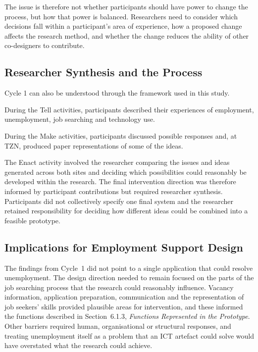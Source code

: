 The issue is therefore not whether participants should have power to change the process, but how that power is balanced. Researchers need to consider which decisions fall within a participant's area of experience, how a proposed change affects the research method, and whether the change reduces the ability of other co-designers to contribute.


\subsection{Researcher Synthesis and the \texorpdfstring{\tme}{Tell-Make-Enact} Process}

Cycle 1 can also be understood through the \tme{} framework used in this study.

During the Tell activities, participants described their experiences of employment, unemployment, job searching and technology use.

During the Make activities, participants discussed possible responses and, at TZN, produced paper representations of some of the ideas.

The Enact activity involved the researcher comparing the issues and ideas generated across both sites and deciding which possibilities could reasonably be developed within the research. The final intervention direction was therefore informed by participant contributions but required researcher synthesis. Participants did not collectively specify one final system and the researcher retained responsibility for deciding how different ideas could be combined into a feasible prototype.


\subsection{Implications for Employment Support Design}

The findings from Cycle~1 did not point to a single application that could resolve unemployment. The design direction needed to remain focused on the parts of the job searching process that the research could reasonably influence. Vacancy information, application preparation, communication and the representation of job seekers' skills provided plausible areas for intervention, and these informed the functions described in Section~6.1.3, \textit{Functions Represented in the Prototype}. Other barriers required human, organisational or structural responses, and treating unemployment itself as a problem that an ICT artefact could solve would have overstated what the research could achieve.

